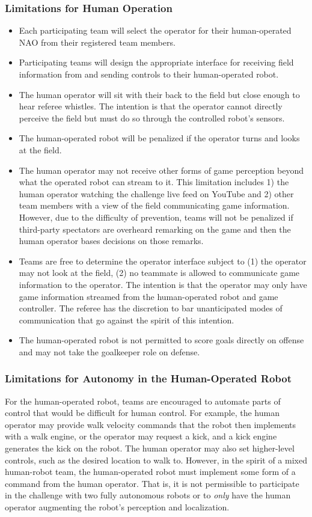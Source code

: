 \subsubsection{Limitations for Human Operation}
\begin{itemize}
	\item Each participating team will select the operator for their human-operated NAO from their registered team members.
	\item Participating teams will design the appropriate interface for receiving field information from and sending controls to their human-operated robot.
	\item The human operator will sit with their back to the field but close enough to hear referee whistles. The intention is that the operator cannot directly perceive the field but must do so through the controlled robot’s sensors.
	\item The human-operated robot will be penalized if the operator turns and looks at the field.
	\item The human operator may not receive other forms of game perception beyond what the operated robot can stream to it. This limitation includes 1) the human operator watching the challenge live feed on YouTube and 2) other team members with a view of the field communicating game information. However, due to the difficulty of prevention, teams will not be penalized if third-party spectators are overheard remarking on the game and then the human operator bases decisions on those remarks.
	\item Teams are free to determine the operator interface subject to (1) the operator may not look at the field, (2) no teammate is allowed to communicate game information to the operator. The intention is that the operator may only have game information streamed from the human-operated robot and game controller. The referee has the discretion to bar unanticipated modes of communication that go against the spirit of this intention. 
	\item The human-operated robot is not permitted to score goals directly on offense and may not take the goalkeeper role on defense.
\end{itemize}

\subsubsection{Limitations for Autonomy in the Human-Operated Robot}


For the human-operated robot, teams are encouraged to automate parts of control that would be difficult for human control. For example, the human operator may provide walk velocity commands that the robot then implements with a walk engine, or the operator may request a kick, and a kick engine generates the kick on the robot. The human operator may also set higher-level controls, such as the desired location to walk to. However, in the spirit of a mixed human-robot team, the human-operated robot must implement some form of a command from the human operator. That is, it is not permissible to participate in the challenge with two fully autonomous robots or to \textit{only} have the human operator augmenting the robot's perception and localization. 

